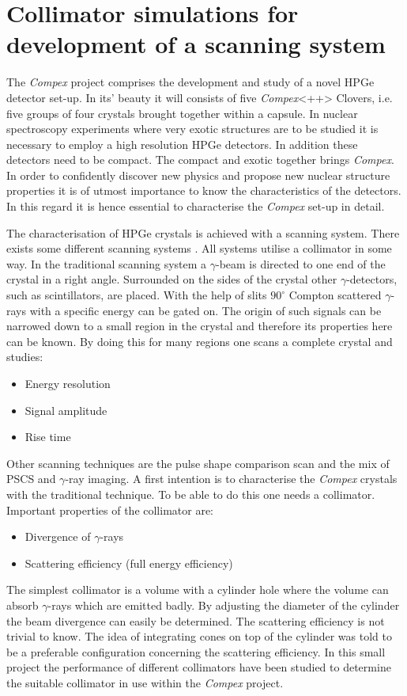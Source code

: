 \documentclass[a4paper]{article}
\begin{document}
\section{Collimator simulations for development of a scanning system}

The \textit{Compex} project comprises the development and study of a novel HPGe detector set-up. In its' beauty it will consists of five \textit{Compex}<++> Clovers, i.e. five groups of four crystals brought together within a capsule.
In nuclear spectroscopy experiments where very exotic structures are to be studied it is necessary to employ a high resolution HPGe detectors. In addition these detectors need to be compact. The compact and exotic together brings \textit{Compex}. In order to confidently discover new physics and propose new nuclear structure properties it is of utmost importance to know the characteristics of the detectors. In this regard it is hence essential to characterise the \textit{Compex} set-up in detail.

The characterisation of HPGe crystals is achieved with a scanning system. There exists some different scanning systems \cite{}. All systems utilise a collimator in some way. In the traditional scanning system a $\gamma$-beam is directed to one end of the crystal in a right angle. Surrounded on the sides of the crystal other $\gamma$-detectors, such as scintillators, are placed. With the help of slits $90 ^\circ$ Compton scattered $\gamma$-rays with a specific energy can be gated on. The origin of such signals can be narrowed down to a small region in the crystal and therefore its properties here can be known. By doing this for many regions one scans a complete crystal and studies:
\begin{itemize}
  \item Energy resolution
  \item Signal amplitude
  \item Rise time
\end{itemize}

Other scanning techniques are the pulse shape comparison scan and the mix of PSCS and $\gamma$-ray imaging.
A first intention is to characterise the \textit{Compex} crystals with the traditional technique.
To be able to do this one needs a collimator.
Important properties of the collimator are:
\begin{itemize}
  \item Divergence of $\gamma$-rays
  \item Scattering efficiency (full energy efficiency)
\end{itemize}
The simplest collimator is a volume with a cylinder hole where the volume can absorb $\gamma$-rays which are emitted badly.
By adjusting the diameter of the cylinder the beam divergence can easily be determined.
The scattering efficiency is not trivial to know.
The idea of integrating cones on top of the cylinder was told to be a preferable configuration concerning the scattering efficiency.
In this small project the performance of different collimators have been studied to determine the suitable collimator in use within the \textit{Compex} project.
\end{document}

